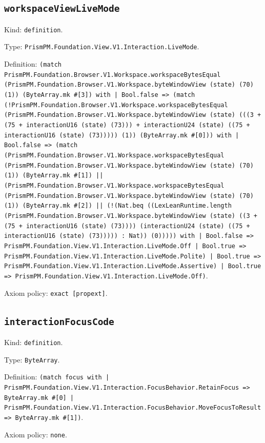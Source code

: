 \documentclass[11pt]{article}
\begin{document}
\subsection*{\texttt{workspaceViewLiveMode}}
\noindent Kind: \texttt{definition}.\par
\noindent Type: \texttt{PrismPM.Foundation.View.V1.Interaction.LiveMode}.\par
\noindent Definition: \texttt{(match PrismPM.Foundation.Browser.V1.Workspace.workspaceBytesEqual (PrismPM.Foundation.Browser.V1.Workspace.byteWindowView (state) (70) (1)) (ByteArray.mk \#[3]) with | Bool.false => (match (!PrismPM.Foundation.Browser.V1.Workspace.workspaceBytesEqual (PrismPM.Foundation.Browser.V1.Workspace.byteWindowView (state) (((3 + (75 + interactionU16 (state) (73))) + interactionU24 (state) ((75 + interactionU16 (state) (73))))) (1)) (ByteArray.mk \#[0])) with | Bool.false => (match (PrismPM.Foundation.Browser.V1.Workspace.workspaceBytesEqual (PrismPM.Foundation.Browser.V1.Workspace.byteWindowView (state) (70) (1)) (ByteArray.mk \#[1]) || (PrismPM.Foundation.Browser.V1.Workspace.workspaceBytesEqual (PrismPM.Foundation.Browser.V1.Workspace.byteWindowView (state) (70) (1)) (ByteArray.mk \#[2]) || (!(Nat.beq ((LexLeanRuntime.length (PrismPM.Foundation.Browser.V1.Workspace.byteWindowView (state) ((3 + (75 + interactionU16 (state) (73)))) (interactionU24 (state) ((75 + interactionU16 (state) (73))))) : Nat)) (0))))) with | Bool.false => PrismPM.Foundation.View.V1.Interaction.LiveMode.Off | Bool.true => PrismPM.Foundation.View.V1.Interaction.LiveMode.Polite) | Bool.true => PrismPM.Foundation.View.V1.Interaction.LiveMode.Assertive) | Bool.true => PrismPM.Foundation.View.V1.Interaction.LiveMode.Off)}.\par
\noindent Axiom policy: \texttt{exact [propext]}.\par
\subsection*{\texttt{interactionFocusCode}}
\noindent Kind: \texttt{definition}.\par
\noindent Type: \texttt{ByteArray}.\par
\noindent Definition: \texttt{(match focus with | PrismPM.Foundation.View.V1.Interaction.FocusBehavior.RetainFocus => ByteArray.mk \#[0] | PrismPM.Foundation.View.V1.Interaction.FocusBehavior.MoveFocusToResult => ByteArray.mk \#[1])}.\par
\noindent Axiom policy: \texttt{none}.\par
\end{document}

